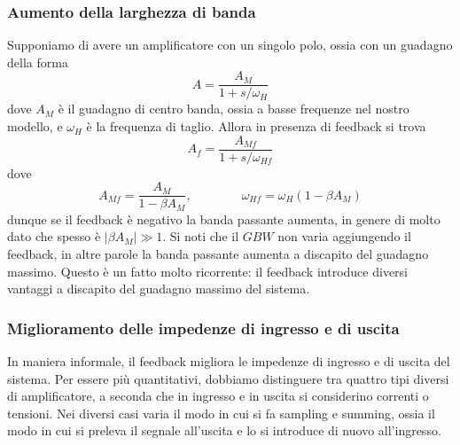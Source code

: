 \documentclass[a4paper, 11pt]{article}
\begin{document}
\subsubsection{Aumento della larghezza di banda}
Supponiamo di avere un amplificatore con un singolo polo, ossia con un guadagno della forma
\[A=\frac{A_M}{1+s/\omega_H}\]
dove $A_M$ è il guadagno di centro banda, ossia a basse frequenze nel nostro modello, e $\omega_H$ è la frequenza di taglio. Allora in presenza di feedback si trova
\[A_f=\frac{A_{Mf}}{1+s/\omega_{Hf}}\]
dove
\[A_{Mf}=\frac{A_M}{1-\beta A_M},\qquad\qquad\omega_{Hf}=\omega_H(1-\beta A_M)\]
dunque se il feedback è negativo la banda passante aumenta, in genere di molto dato che spesso è $|\beta A_M|\gg1$. Si noti che il $GBW$ non varia aggiungendo il feedback, in altre parole la banda passante aumenta a discapito del guadagno massimo. Questo è un fatto molto ricorrente: il feedback introduce diversi vantaggi a discapito del guadagno massimo del sistema.
\subsubsection{Miglioramento delle impedenze di ingresso e di uscita}
In maniera informale, il feedback migliora le impedenze di ingresso e di uscita del sistema. Per essere più quantitativi, dobbiamo distinguere tra quattro tipi diversi di amplificatore, a seconda che in ingresso e in uscita si considerino correnti o tensioni. Nei diversi casi varia il modo in cui si fa sampling e summing, ossia il modo in cui si preleva il segnale all'uscita e lo si introduce di nuovo all'ingresso.
\end{document}
